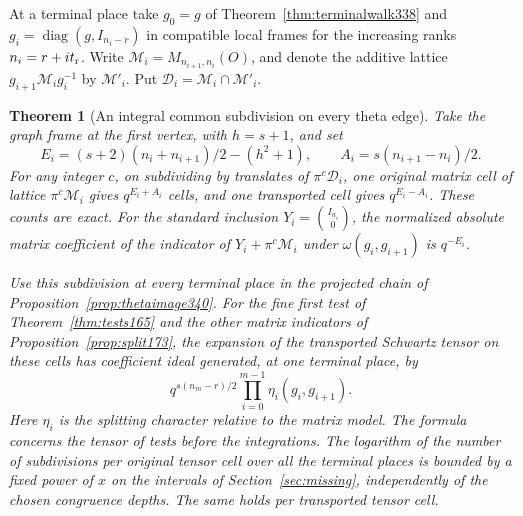 \documentclass[a4paper,11pt]{article}
\newtheorem{theorem}[proposition]{Theorem}
\theoremstyle{definition}
\theoremstyle{remark}
\numberwithin{equation}{section}
\begin{document}
At a terminal place take $g_0=g$ of Theorem~\ref{thm:terminalwalk338}
and $g_i=\operatorname{diag}(g,I_{n_i-r})$ in compatible local frames
for the increasing ranks $n_i=r+it_{\rm r}$. Write
$\mathcal M_i=M_{n_{i+1},n_i}(O)$, and denote the additive lattice
$g_{i+1}\mathcal M_i g_i^{-1}$ by $\mathcal M'_i$. Put
$\mathcal D_i=\mathcal M_i\cap\mathcal M'_i$.

\begin{theorem}[An integral common subdivision on every theta edge]\leavevmode\label{thm:thetacells340}
Take the graph frame at the first vertex, with $h=s+1$, and set
\[
   E_i=(s+2)(n_i+n_{i+1})/2-(h^2+1),\qquad
   A_i=s(n_{i+1}-n_i)/2 .
\]
For any integer $c$, on subdividing by translates of $\pi^c\mathcal D_i$,
one original matrix cell of lattice $\pi^c\mathcal M_i$ gives
$q^{E_i+A_i}$ cells, and one transported cell gives $q^{E_i-A_i}$.
These counts are exact. For the standard inclusion
$Y_i=\binom{I_{n_i}}{0}$, the normalized absolute matrix coefficient
of the indicator of $Y_i+\pi^c\mathcal M_i$ under
$\omega(g_i,g_{i+1})$ is $q^{-E_i}$.

Use this subdivision at every terminal place in the projected chain
of Proposition~\ref{prop:thetaimage340}. For the fine first test of
Theorem~\ref{thm:tests165} and the other matrix indicators of
Proposition~\ref{prop:split173}, the expansion of the transported
Schwartz tensor on these cells has coefficient ideal generated, at
one terminal place, by
\[
               q^{s(n_m-r)/2}\prod_{i=0}^{m-1}\eta_i(g_i,g_{i+1}).
\]
Here $\eta_i$ is the splitting character relative to the matrix model.
The formula concerns the tensor of tests before the integrations.
The logarithm of the number of subdivisions per original tensor cell
over all the terminal places is bounded by a fixed power of $x$ on
the intervals of Section~\ref{sec:missing}, independently of the
chosen congruence depths. The same holds per transported tensor cell.
\end{theorem}
\end{document}
